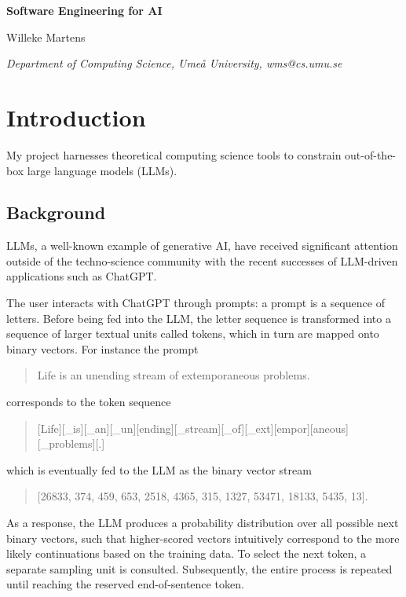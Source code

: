 \documentclass[a4paper, 11pt]{article}
\begin{document}
\begin{center}
	
{\large \bf Software Engineering for AI 
}
\bigskip

{Willeke Martens
}

\smallskip

{\small\it
Department of Computing Science, Umeå University, wms@cs.umu.se
}
\end{center}

\bigskip

\section{Introduction}
My project harnesses theoretical computing science tools to constrain out-of-the-box large language models (LLMs).

\subsection{Background}
LLMs, a well-known example of generative AI, have received significant attention outside of the techno-science community with the recent successes of LLM-driven applications such as ChatGPT. 

The user interacts with ChatGPT through prompts: a prompt is a sequence of letters. Before being fed into the LLM, the letter sequence is transformed into a sequence of larger textual units called tokens, which in turn are mapped onto binary vectors. For instance the prompt
\begin{quote}
    Life is an unending stream of extemporaneous problems. 
\end{quote}
corresponds to the token sequence 
\begin{quote}
    [Life][\_is][\_an][\_un][ending][\_stream][\_of][\_ext][empor][aneous][\_problems][.]
\end{quote}
which is eventually fed to the LLM as the binary vector stream
\begin{quote}
     [26833, 374, 459, 653, 2518, 4365, 315, 1327, 53471, 18133, 5435, 13].
\end{quote}
As a response, the LLM produces a probability distribution over all possible next binary vectors, 
such that higher-scored vectors intuitively correspond to the more likely continuations based on the training data. To select the next token, a separate sampling unit is consulted.  Subsequently, the entire process is repeated until reaching the reserved end-of-sentence token. 
\end{document}
